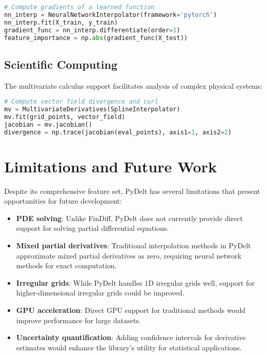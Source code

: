 \documentclass[11pt,a4paper]{article}
\begin{document}
\begin{lstlisting}[language=Python, caption=Machine learning example]
# Compute gradients of a learned function
nn_interp = NeuralNetworkInterpolator(framework='pytorch')
nn_interp.fit(X_train, y_train)
gradient_func = nn_interp.differentiate(order=1)
feature_importance = np.abs(gradient_func(X_test))
\end{lstlisting}

\subsection{Scientific Computing}

The multivariate calculus support facilitates analysis of complex physical systems:

\begin{lstlisting}[language=Python, caption=Scientific computing example]
# Compute vector field divergence and curl
mv = MultivariateDerivatives(SplineInterpolator)
mv.fit(grid_points, vector_field)
jacobian = mv.jacobian()
divergence = np.trace(jacobian(eval_points), axis1=1, axis2=2)
\end{lstlisting}

\section{Limitations and Future Work}

Despite its comprehensive feature set, PyDelt has several limitations that present opportunities for future development:

\begin{itemize}
    \item \textbf{PDE solving}: Unlike FinDiff, PyDelt does not currently provide direct support for solving partial differential equations.
    
    \item \textbf{Mixed partial derivatives}: Traditional interpolation methods in PyDelt approximate mixed partial derivatives as zero, requiring neural network methods for exact computation.
    
    \item \textbf{Irregular grids}: While PyDelt handles 1D irregular grids well, support for higher-dimensional irregular grids could be improved.
    
    \item \textbf{GPU acceleration}: Direct GPU support for traditional methods would improve performance for large datasets.
    
    \item \textbf{Uncertainty quantification}: Adding confidence intervals for derivative estimates would enhance the library's utility for statistical applications.
\end{itemize}
\end{document}
